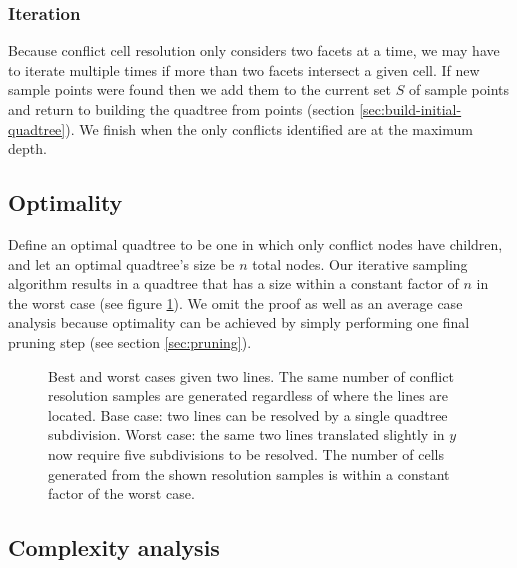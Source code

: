 \documentclass[final,3p,times,twocolumn]{elsarticle}
\begin{document}
\subsubsection{Iteration}
\label{sec:iterate}

Because conflict cell resolution only considers two facets at a time, we may have to iterate multiple times if more than two facets intersect a given cell. If new sample points were found then we add them to the current set $S$ of sample points and return to building the quadtree from points (section \ref{sec:build-initial-quadtree}). We finish when the only conflicts identified are at the maximum depth.

\subsection{Optimality}
Define an optimal quadtree to be one in which only conflict nodes have children, and let an optimal quadtree's size be $n$ total nodes. Our iterative sampling algorithm results in a quadtree that has a size within a constant factor of $n$ in the worst case (see figure \ref{fig:optimality}). We omit the proof as well as an average case analysis because optimality can be achieved by simply performing one final pruning step (see section \ref{sec:pruning}).

\begin{figure}
  \centering
  \caption{
    Best and worst cases given two lines. The same number of conflict resolution samples are generated regardless of where the lines are located.
    \protect{} Base case: two lines can be resolved by a single quadtree subdivision.
    \protect{} Worst case: the same two lines translated slightly in $y$ now require five subdivisions to be resolved.
    \protect{} The number of cells generated from the shown resolution samples is within a constant factor of the worst case.
  }
  \label{fig:optimality}
\end{figure}

\subsection{Complexity analysis}
\end{document}
